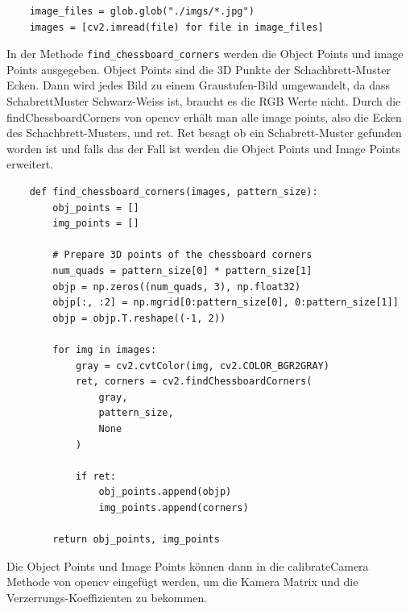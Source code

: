 \begin{lstlisting}
    image_files = glob.glob("./imgs/*.jpg")
    images = [cv2.imread(file) for file in image_files]
\end{lstlisting}


In der Methode \texttt{find\_chessboard\_corners} werden die Object Points und image Points ausgegeben. Object Points sind die 3D Punkte der Schachbrett-Muster Ecken.
Dann wird jedes Bild zu einem Graustufen-Bild umgewandelt, da dass SchabrettMuster Schwarz-Weiss ist, braucht es die RGB Werte nicht. 
Durch die findChessboardCorners von opencv erhält man alle image points, also die Ecken des Schachbrett-Musters, und ret. 
Ret besagt ob ein Schabrett-Muster gefunden worden ist und falls das der Fall ist werden die Object Points und Image Points erweitert. \clearpage



\begin{lstlisting}
    def find_chessboard_corners(images, pattern_size):
        obj_points = []
        img_points = []

        # Prepare 3D points of the chessboard corners
        num_quads = pattern_size[0] * pattern_size[1]
        objp = np.zeros((num_quads, 3), np.float32)
        objp[:, :2] = np.mgrid[0:pattern_size[0], 0:pattern_size[1]]
        objp = objp.T.reshape((-1, 2))

        for img in images:
            gray = cv2.cvtColor(img, cv2.COLOR_BGR2GRAY)
            ret, corners = cv2.findChessboardCorners(
                gray,
                pattern_size, 
                None
            )

            if ret:
                obj_points.append(objp)
                img_points.append(corners)

        return obj_points, img_points
\end{lstlisting}

Die Object Points und Image Points können dann in die calibrateCamera Methode von opencv eingefügt 
werden, um die Kamera Matrix und die Verzerrungs-Koeffizienten zu bekommen.



